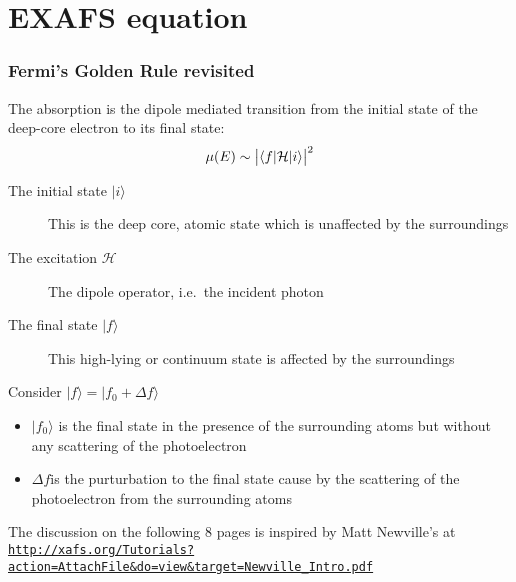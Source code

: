 \documentclass[10pt, xcolor=x11names, compress]{beamer}
\begin{document}

\section{EXAFS equation}


\begin{frame}
  \frametitle{Fermi's Golden Rule revisited}
  The absorption is the dipole mediated transition from the initial
  state of the deep-core electron to its final state:
  \begin{equation}
    \mu(E) \sim \big|\langle f| \mathcal{H}|i\rangle\big|^2
    \notag
  \end{equation}
  \begin{description}
  \item[The initial state $|i\rangle$] This is the deep core, atomic
    state which is unaffected by the surroundings
  \item[The excitation $\mathcal{H}$] The dipole operator, i.e.\ the
    incident photon
  \item[The final state $|f\rangle$] This high-lying or continuum
    state \alert{is} affected by the surroundings
  \end{description}
  \begin{block}{Consider $|f\rangle = |f_0+\Delta f\rangle$}
    \begin{itemize}
    \item $|f_0\rangle$ is the final state in the presence of the
      surrounding atoms but \alert{without} any scattering of the
      photoelectron
    \item $\Delta f$is the purturbation to the final state cause by
      the scattering of the photoelectron from the surrounding atoms
    \end{itemize}
  \end{block}
  \begin{bottomnote}[0.6][19]
    The discussion on the following 8 pages is inspired by Matt
    Newville's at
    \href{http://xafs.org/Tutorials?action=AttachFile&do=view&target=Newville_Intro.pdf}
    {\color{LightBlue4}\texttt{http://xafs.org/Tutorials?action=AttachFile\&do=view\&target=Newville\_Intro.pdf}}
  \end{bottomnote}
\end{frame}
\end{document}
